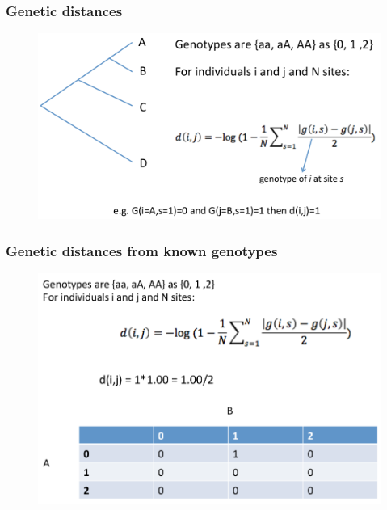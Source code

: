 
\begin{frame}
\frametitle{Genetic distances}

        \begin{figure}
                \includegraphics[width=\textwidth]{Pics/gdist_2.png}
        \end{figure}

\end{frame}


\begin{frame}
\frametitle{Genetic distances from known genotypes}

        \begin{figure}
                \includegraphics[width=\textwidth]{Pics/gdist_3.png}
        \end{figure}

\end{frame}

